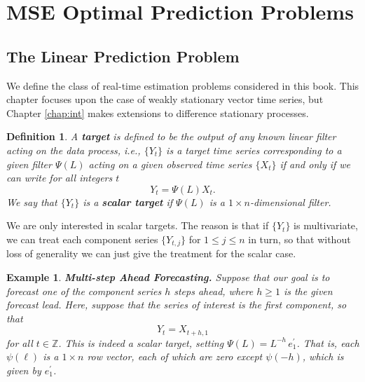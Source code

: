 \documentclass[a4paper]{book}
\def\ZZ{\mathbb Z}
\newtheorem{Definition}{Definition}
\newtheorem{Example}{Example}
\begin{document}
\section{MSE Optimal Prediction Problems}

\subsection{The Linear Prediction Problem} We define the class of
real-time estimation problems considered in this book.  This chapter
 focuses upon the case of weakly stationary vector time series, but
 Chapter \ref{chap:int} makes extensions to difference stationary processes.

\begin{Definition} \rm
\label{def:target}
 A {\bf target} is defined to be the output of any known linear
 filter acting on the data process, i.e.,  $\{Y_t \}$ is a target
 time series corresponding to a given filter $\Psi (L)$ acting on a 
given observed time series
 $\{ X_t \}$ if and only if we can write for all integers $t$
\[
 Y_t = \Psi (L) X_t.
\] 
 We say that $\{ Y_t \}$ is a {\bf scalar target} if $\Psi (L)$ is a
 $1 \times n$-dimensional filter.
\end{Definition}

We are only interested in scalar targets.  The reason is that if $\{ Y_t \}$
 is multivariate, we can treat each component series $\{ Y_{t,j} \}$ for
 $1 \leq j \leq n$ in turn, so that without loss of generality we
 can just give the treatment for the scalar case. 

\begin{Example} {\bf  Multi-step Ahead Forecasting.}   \rm
\label{exam:multi-step.fore}
  Suppose that our goal is to forecast one of the component series 
 $h$ steps ahead, where $h \geq 1$ is the given {\em forecast lead}.
  Here, suppose that the series of interest is the first component, so 
 that 
\[
  Y_t = X_{t+h,1}
\]
  for all $ t \in \ZZ$.  This is indeed a scalar target, setting
  $\Psi (L) = L^{-h} \, e_1^{\prime}$.  That is, each $\psi (\ell)$
 is a $1 \times n$ row vector, each of which are zero except $\psi (-h)$,
 which is given by $e_1^{\prime}$.
\end{Example}
\end{document}
